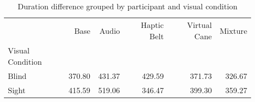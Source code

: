 
\begin{table}[!htb]
\centering
\caption{Duration difference grouped by participant and visual condition}
\label{tab:duracao_average_group}
\begin{tabular}{lrrrrr}
\toprule
{} &    Base &   Audio & Haptic Belt & Virtual Cane & Mixture \\
Visual Condition &         &         &             &              &         \\
\midrule
Blind            &  370.80 &  431.37 &      429.59 &       371.73 &  326.67 \\
Sight            &  415.59 &  519.06 &      346.47 &       399.30 &  359.27 \\
\bottomrule
\end{tabular}
\end{table}

